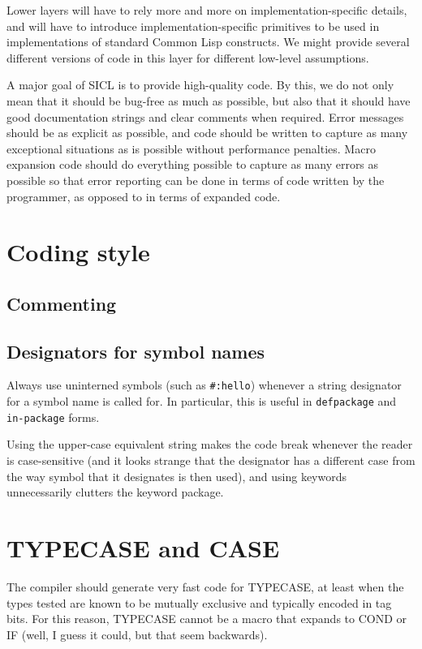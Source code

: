 \documentclass{article}
\def\sysname{SICL}
\begin{document}
Lower layers will have to rely more and more on
implementation-specific details, and will have to introduce
implementation-specific primitives to be used in implementations of
standard Common Lisp constructs.  We might provide several different
versions of code in this layer for different low-level assumptions.

A major goal of \sysname{} is to provide high-quality code.  By this,
we do not only mean that it should be bug-free as much as possible,
but also that it should have good documentation strings and clear
comments when required.  Error messages should be as explicit as
possible, and code should be written to capture as many exceptional
situations as is possible without performance penalties.  Macro
expansion code should do everything possible to capture as many errors
as possible so that error reporting can be done in terms of code
written by the programmer, as opposed to in terms of expanded code. 

\section{Coding style}

\subsection{Commenting}

\subsection{Designators for symbol names}

Always use uninterned symbols (such as \texttt{\#:hello}) whenever a
string designator for a symbol name is called for.  In particular,
this is useful in \texttt{defpackage} and \texttt{in-package} forms.

Using the upper-case equivalent string makes the code break whenever
the reader is case-sensitive (and it looks strange that the designator
has a different case from the way symbol that it designates is then
used), and using keywords unnecessarily clutters the keyword package.

\section{TYPECASE and CASE}

The compiler should generate very fast code for TYPECASE, at least
when the types tested are known to be mutually exclusive and typically
encoded in tag bits.  For this reason, TYPECASE cannot be a macro that
expands to COND or IF (well, I guess it could, but that seem backwards).
\end{document}
